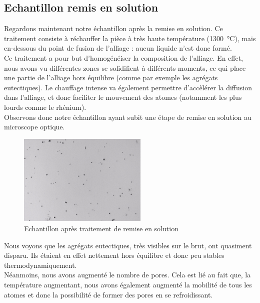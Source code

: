 \subsection*{Echantillon remis en solution}

Regardons maintenant notre échantillon après la remise en solution. 
Ce traitement consiste à réchauffer la pièce à très haute température (\SI{1300}{\celsius}),
mais en-dessous du point de fusion de l'alliage : aucun liquide n'est donc formé.\\


Ce traitement a pour but d'homogénéiser la composition de l'alliage. En effet, nous avons 
vu différentes zones se solidifient à différents moments, ce qui place une partie de l'alliage
hors équilibre (comme par exemple les agrégats eutectiques). Le chauffage intense va également 
permettre d'accèlérer la diffusion dans l'alliage, et donc faciliter le mouvement des atomes 
(notamment les plus lourds comme le rhénium).\\


Observons donc notre échantillon ayant subit une étape de remise en solution au microscope optique.\\

\begin{figure}[H]
    \centering
    \includegraphics[width=0.55\textwidth]{images_optique/res.pdf}
    \caption{Echantillon après traitement de remise en solution}
    \label{fig:RES_optique}
\end{figure}

Nous voyons que les agrégats eutectiques, très visibles sur le brut, ont quasiment disparu.
Ils étaient en effet nettement hors équilibre et donc peu stables thermodynamiquement.\\


Néanmoins, nous avons augmenté le nombre de pores. Cela est lié au fait que, la température 
augmentant, nous avons également augmenté la mobilité de tous les atomes et donc la possibilité
de former des pores en se refroidissant.\\


